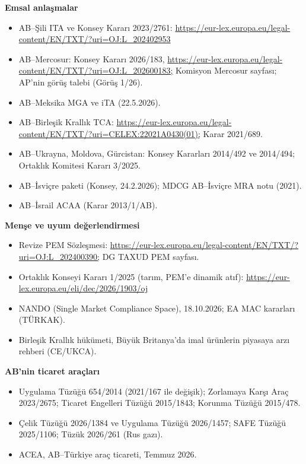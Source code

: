 \textbf{Emsal anlaşmalar}

\begin{itemize}
\tightlist
\item
  AB--Şili ITA ve Konsey Kararı 2023/2761: \url{https://eur-lex.europa.eu/legal-content/EN/TXT/?uri=OJ:L_202402953}
\item
  AB--Mercosur: Konsey Kararı 2026/183, \url{https://eur-lex.europa.eu/legal-content/EN/TXT/?uri=OJ:L_202600183;} Komisyon Mercosur sayfası; AP'nin görüş talebi (Görüş 1/26).
\item
  AB--Meksika MGA ve iTA (22.5.2026).
\item
  AB--Birleşik Krallık TCA: \url{https://eur-lex.europa.eu/legal-content/EN/TXT/?uri=CELEX:22021A0430(01);} Karar 2021/689.
\item
  AB--Ukrayna, Moldova, Gürcistan: Konsey Kararları 2014/492 ve 2014/494; Ortaklık Komitesi Kararı 3/2025.
\item
  AB--İsviçre paketi (Konsey, 24.2.2026); MDCG AB--İsviçre MRA notu (2021).
\item
  AB--İsrail ACAA (Karar 2013/1/AB).
\end{itemize}

\textbf{Menşe ve uyum değerlendirmesi}

\begin{itemize}
\tightlist
\item
  Revize PEM Sözleşmesi: \url{https://eur-lex.europa.eu/legal-content/EN/TXT/?uri=OJ:L_202400390;} DG TAXUD PEM sayfası.
\item
  Ortaklık Konseyi Kararı 1/2025 (tarım, PEM'e dinamik atıf): \url{https://eur-lex.europa.eu/eli/dec/2026/1903/oj}
\item
  NANDO (Single Market Compliance Space), 18.10.2026; EA MAC kararları (TÜRKAK).
\item
  Birleşik Krallık hükümeti, Büyük Britanya'da imal ürünlerin piyasaya arzı rehberi (CE/UKCA).
\end{itemize}

\textbf{AB'nin ticaret araçları}

\begin{itemize}
\tightlist
\item
  Uygulama Tüzüğü 654/2014 (2021/167 ile değişik); Zorlamaya Karşı Araç 2023/2675; Ticaret Engelleri Tüzüğü 2015/1843; Korunma Tüzüğü 2015/478.
\item
  Çelik Tüzüğü 2026/1384 ve Uygulama Tüzüğü 2026/1457; SAFE Tüzüğü 2025/1106; Tüzük 2026/261 (Rus gazı).
\item
  ACEA, AB--Türkiye araç ticareti, Temmuz 2026.
\end{itemize}


